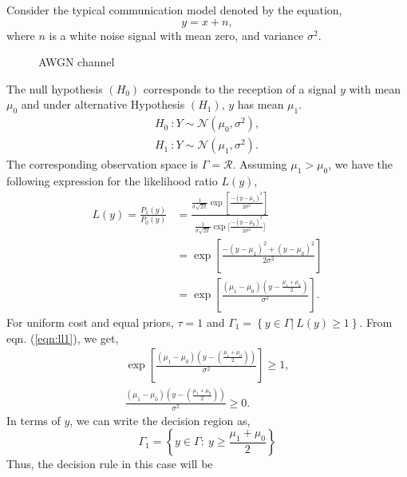 \documentclass[a4paper,english,12pt]{article}
\begin{document}
\begin{exmp} 
Consider the typical communication model denoted by the equation, 
\begin{equation}
y=x+n,
\end{equation}
where $n$ is a white noise signal with mean zero, and variance $\sigma^2$.
\begin{figure}[h]
\centering

\caption[awgn]{AWGN channel}
\label{fig:AWGN}
\end{figure}
The null hypothesis $(H_0)$ corresponds to the reception of a signal $y$ with mean $\mu_0$ and under alternative Hypothesis $(H_1)$, $y$ has mean $\mu_1$. 
\begin{eqnarray}
{H_0}~:Y \sim \mathcal{N} \left( \mu _0, \sigma^2\right), \\
{H_1}~:Y \sim \mathcal{N} \left( \mu _1, \sigma^2\right).
\end{eqnarray}
The corresponding observation space is $\Gamma = \mathcal{R}$. Assuming $\mu_1>\mu_0$, we have the following expression for the likelihood ratio $L(y)$,
\begin{align}\label{eqn:ll1}
\nonumber
L(y) = \frac{P_1(y)}{P_0(y)} &= \frac{{\frac{1}{{\sigma \sqrt {2\pi } }}\exp[\frac{{ - {{(y - {\mu _1})}^2}}}{{2{\sigma ^2}}}]
}}{{\frac{1}{{\sigma \sqrt {2\pi } }}\exp[\frac{{ - {{(y - {\mu _0})}^2}}}{{2{\sigma ^2}}}}]
}\\\nonumber
&={\exp\left[{\frac{{ - {{(y - {\mu _1})}^2} + {{(y - {\mu _0})}^2}}}{{2{\sigma ^2}}}}\right]}\\
&=\exp\left[{\frac{{(\mu_1-\mu_0)\left( {y - \frac{{{\mu _1}+{\mu _0}}}{2}} \right)}}{{{\sigma ^2}}}}\right].
\end{align}
For uniform cost and equal priors, $\tau = 1$ and $\Gamma_1 = \left\lbrace y\in \Gamma|~{L(y)\geq1}\right\rbrace$. From eqn. (\ref{eqn:ll1}), we get, 
\begin{eqnarray}
	{\exp\left[{\frac{{({\mu _{1}} - {\mu _0})\left( {y - (\frac{{{\mu_{1}} +{\mu _0}}}{2})} \right)}}{{{\sigma ^2}}}} \right]}\geq 1,\\\nonumber
	{\frac{{({\mu _{1 }}-{\mu _0})\left( {y - (\frac{{{\mu _{1}}+{\mu _0}}}{2})} \right)}}{{{\sigma ^2}}}}\geq 0.
\end{eqnarray}
In terms of $y$, we can write the decision region as,
\begin{equation}
\Gamma _1 = \left\lbrace y\in \Gamma :~ y \ge \frac{{{\mu _1} + {\mu _0}}}{2} \right\rbrace
\end{equation}
Thus, the decision rule in this case will be

\end{exmp}
\end{document}
